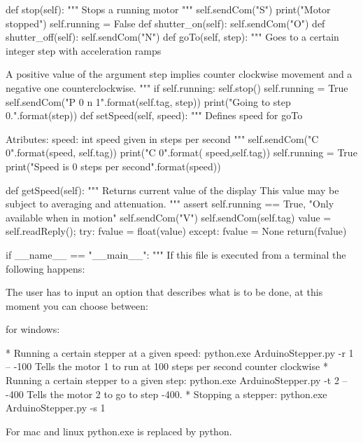 \begin{python}
    def stop(self):
        """ Stops a running motor """
        self.sendCom("S")
        print("Motor stopped")
        self.running = False
    def shutter_on(self):    
        self.sendCom("O")
    def shutter_off(self):
        self.sendCom("N")
    def goTo(self, step):
        """ Goes to a certain integer step with acceleration ramps

        A positive value of the argument step implies counter clockwise
        movement and a negative one counterclockwise. 
        """
        if self.running:
            self.stop()
        self.running = True
        self.sendCom("P {0} n {1}".format(self.tag, step))
        print("Going to step {0}.".format(step))
    def setSpeed(self, speed):
        """ Defines speed for goTo 
        
        Atributes:
            speed: int speed given in steps per second
        """
        self.sendCom("C {0}".format(speed, self.tag))
        print("C {0}".format( speed,self.tag))
        self.running = True
        print("Speed is {0} steps per second".format(speed))
        
    def getSpeed(self):
        """ Returns current value of the display
        This value may be subject to averaging and attenuation.
        """
        assert self.running == True, "Only available when in motion"
        self.sendCom("V")
        self.sendCom(self.tag)
        value = self.readReply();
        try:
            fvalue = float(value)
        except:
            fvalue = None
        return(fvalue)
       
if __name__ == "__main__":
    """ If this file is executed from a terminal the following happens:
    
    The user has to input an option that describes what is to be done, 
    at this moment you can choose between:

    for windows: 
    
    * Running a certain stepper at a given speed:
         python.exe ArduinoStepper.py -r 1 -- -100
      Tells  the motor 1 to run at 100 steps per second counter clockwise
    * Running a certain stepper to a given step:
         python.exe ArduinoStepper.py -t 2 -- -400
      Tells  the motor 2 to go to step -400. 
    * Stopping a stepper:
         python.exe ArduinoStepper.py -s 1

    For mac and linux python.exe is replaced by python.


\end{python}
